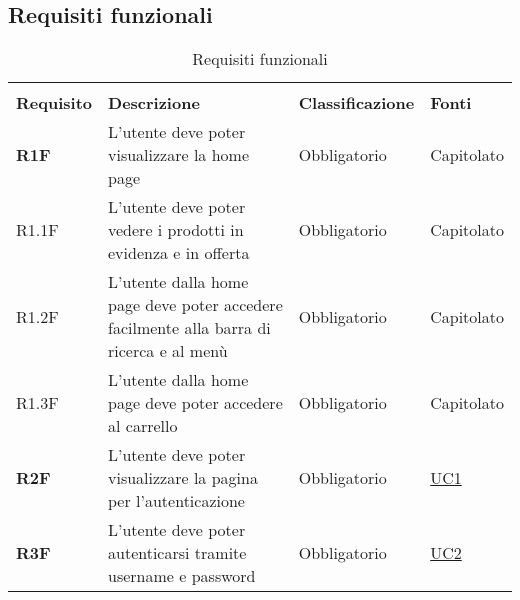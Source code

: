 \subsection{Requisiti funzionali}
\begin{center}
    \centering
    \renewcommand{\arraystretch}{1.8}
    \label{tab:RequisitiFunzionali}
    \begin{longtable}[!h]{p{50px} p{245px} p{75px} p{50px}}
        \rowcolor{white}\caption{Requisiti funzionali}                                                                                                                                                                          \\
        \rowcolor{logo!70} \textbf{Requisito} & \textbf{Descrizione}                                                                                & \textbf{Classificazione} & \textbf{Fonti}                                 \\
        \textbf{R1F}                          & L'utente deve poter visualizzare la home page                                                       & Obbligatorio             & Capitolato                                     \\
        R1.1F                                 & L'utente deve poter vedere i prodotti in evidenza e in offerta                                      & Obbligatorio             & Capitolato                                     \\
        R1.2F                                 & L'utente dalla home page deve poter accedere facilmente alla barra di ricerca e al menù             & Obbligatorio             & Capitolato                                     \\
        R1.3F                                 & L'utente dalla home page deve poter accedere al carrello                                            & Obbligatorio             & Capitolato                                     \\
        \textbf{R2F}                          & L'utente deve poter visualizzare la pagina per l'autenticazione                                     & Obbligatorio             & \hyperref[sec:UC1]{UC1}                        \\
        \textbf{R3F}                          & L'utente deve poter autenticarsi tramite username e password                                        & Obbligatorio             & \hyperref[sec:UC2]{UC2}                        \\

\end{longtable}
\end{center}
